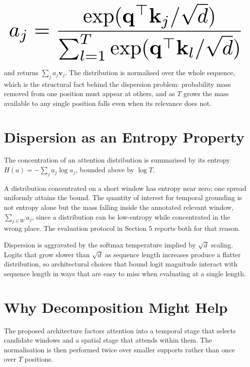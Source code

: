 \documentclass[10pt,journal,compsoc,twocolumn]{IEEEtran}
\begin{document}
\begin{equation}
\resizebox{\columnwidth}{!}{$\displaystyle
\begin{aligned}
a_j = \frac{\exp(\mathbf{q}^{\top}\mathbf{k}_j / \sqrt{d})}{\sum_{l=1}^{T} \exp(\mathbf{q}^{\top}\mathbf{k}_l / \sqrt{d})}
\end{aligned}
$}
\end{equation}








and returns $\sum_j a_j \mathbf{v}_j$. The distribution is normalised over the whole sequence, which is the structural fact behind the dispersion problem: probability mass removed from one position must appear at others, and as $T$ grows the mass available to any single position falls even when its relevance does not.


\section{Dispersion as an Entropy Property}


The concentration of an attention distribution is summarised by its entropy $H(a) = -\sum_j a_j \log a_j$, bounded above by $\log T$.

A distribution concentrated on a short window has entropy near zero; one spread uniformly attains the bound. The quantity of interest for temporal grounding is not entropy alone but the mass falling inside the annotated relevant window, $\sum_{j \in W} a_j$, since a distribution can be low-entropy while concentrated in the wrong place. The evaluation protocol in Section 5 reports both for that reason.

Dispersion is aggravated by the softmax temperature implied by $\sqrt{d}$ scaling. Logits that grow slower than $\sqrt{d}$ as sequence length increases produce a flatter distribution, so architectural choices that bound logit magnitude interact with sequence length in ways that are easy to miss when evaluating at a single length.


\section{Why Decomposition Might Help}


The proposed architecture factors attention into a temporal stage that selects candidate windows and a spatial stage that attends within them. The normalisation is then performed twice over smaller supports rather than once over $T$ positions.
\end{document}
